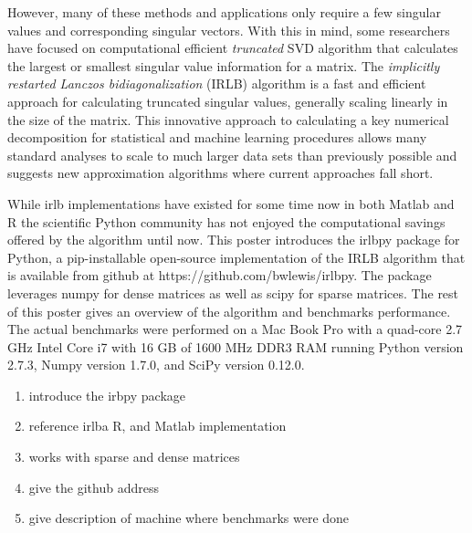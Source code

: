 \documentclass[landscape,a0b,final]{a0poster}
\newenvironment{poster}{
  \begin{center}
  \begin{minipage}[c]{0.98\textwidth}
}{
  \end{minipage} 
  \end{center}
}
\begin{document}
\begin{poster}
\begin{multicols}{3}
\vspace{0.75cm}

However, many of these methods and applications only require a few singular
values and corresponding singular vectors. With this in mind, some researchers
have focused on computational efficient {\em truncated} SVD algorithm that
calculates the largest or smallest singular value information for a matrix.
The {\em implicitly restarted Lanczos bidiagonalization} (IRLB) algorithm
\cite{Baglama2006} is a fast and efficient approach
for calculating truncated singular values, generally scaling linearly in the
size of the matrix. This innovative approach to calculating a key numerical
decomposition for statistical and machine learning procedures allows many
standard analyses to scale to much larger data sets than previously possible
and suggests new approximation algorithms where current approaches fall
short.

\vspace{0.75cm}

While irlb implementations have existed for some time now in both 
Matlab \cite{irlbMatlab} and R \cite{irlbR} the scientific Python community
has not enjoyed the computational savings offered by the algorithm until now.
This poster introduces the irlbpy package for Python, a pip-installable 
open-source implementation of the IRLB algorithm that is available from
github at https://github.com/bwlewis/irlbpy. The package leverages
numpy for dense matrices as well as scipy for sparse matrices. The rest
of this poster gives an overview of the algorithm and benchmarks performance.
The actual benchmarks were performed on a Mac Book Pro with a quad-core
2.7 GHz Intel Core i7 with 16 GB of 1600 MHz DDR3 RAM running Python 
version 2.7.3, Numpy version 1.7.0, and SciPy version 0.12.0.

\begin{enumerate}
\item introduce the irbpy package
\item reference irlba R, and Matlab implementation
\item works with sparse and dense matrices
\item give the github address
\item give description of machine where benchmarks were done
\end{enumerate}




\end{multicols}
\end{poster}
\end{document}
